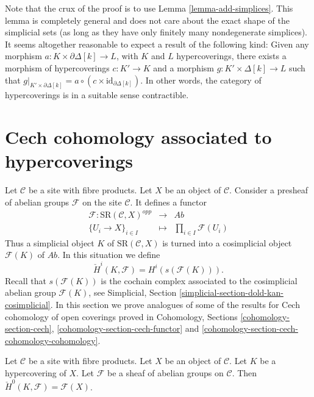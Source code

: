 \begin{remark}
\label{remark-contractible-category}
Note that the crux of the proof is to use
Lemma \ref{lemma-add-simplices}. This lemma
is completely general and does not care about the
exact shape of the simplicial sets (as long as they
have only finitely many nondegenerate simplices).
It seems altogether reasonable to expect a result
of the following kind:
Given any morphism $a : K \times \partial \Delta[k]
\to L$, with $K$ and $L$ hypercoverings, there
exists a morphism of hypercoverings $c : K' \to K$
and a morphism  $g : K' \times \Delta[k] \to L$
such that
$g|_{K' \times \partial \Delta[k]} =
a \circ (c \times \text{id}_{\partial \Delta[k]})$.
In other words, the category of hypercoverings is in
a suitable sense contractible.
\end{remark}










\section{Cech cohomology associated to hypercoverings}
\label{section-hyper-cech}

\noindent
Let $\mathcal{C}$ be a site with fibre products.
Let $X$ be an object of $\mathcal{C}$.
Consider a presheaf of abelian groups
$\mathcal{F}$ on the site $\mathcal{C}$.
It defines a functor
\begin{eqnarray*}
\mathcal{F} : \text{SR}(\mathcal{C}, X)^{opp}
& \longrightarrow &
\textit{Ab} \\
\{U_i \to X\}_{i \in I} &
\longmapsto &
\prod\nolimits_{i \in I} \mathcal{F}(U_i)
\end{eqnarray*}
Thus a simplicial object $K$ of $\text{SR}(\mathcal{C}, X)$
is turned into a cosimplicial object $\mathcal{F}(K)$ of $\textit{Ab}$.
In this situation we define
$$
\check{H}^i(K, \mathcal{F})
=
H^i(s(\mathcal{F}(K))).
$$
Recall that $s(\mathcal{F}(K))$ is the cochain
complex associated to the cosimplicial abelian
group $\mathcal{F}(K)$, see Simplicial, Section
\ref{simplicial-section-dold-kan-cosimplicial}.
In this section we prove analogues of some of the results for
Cech cohomology of open coverings proved in
Cohomology, Sections \ref{cohomology-section-cech},
\ref{cohomology-section-cech-functor} and
\ref{cohomology-section-cech-cohomology-cohomology}.

\begin{lemma}
\label{lemma-h0-cech}
Let $\mathcal{C}$ be a site with fibre products.
Let $X$ be an object of $\mathcal{C}$.
Let $K$ be a hypercovering of $X$.
Let $\mathcal{F}$ be a sheaf of abelian groups on $\mathcal{C}$.
Then $\check{H}^0(K, \mathcal{F}) = \mathcal{F}(X)$.
\end{lemma}

